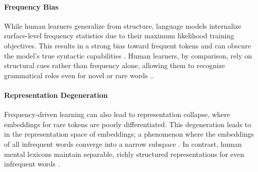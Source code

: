 \paragraph{Frequency Bias} While human learners generalize from structure, language models internalize surface-level frequency statistics due to their maximum likelihood training objectives. This results in a strong bias toward frequent tokens and can obscure the model's true syntactic capabilities \citep{feldman2020does, haviv2023understanding}. Human learners, by comparison, rely on structural cues rather than frequency alone, allowing them to recognize grammatical roles even for novel or rare words \citep{tomasello2003constructing, clark2020emergence}..

\paragraph{Representation Degeneration} Frequency-driven learning can also lead to representation collapse, where embeddings for rare tokens are poorly differentiated. This degeneration leads to  in the representation space of embeddings; a phenomenon where the embeddings of all infrequent words converge into a narrow subspace \citep{ethayarajh2019contextual}. In contrast, human mental lexicons maintain separable, richly structured representations for even infrequent words \citep{murphy2002bigbook}.




